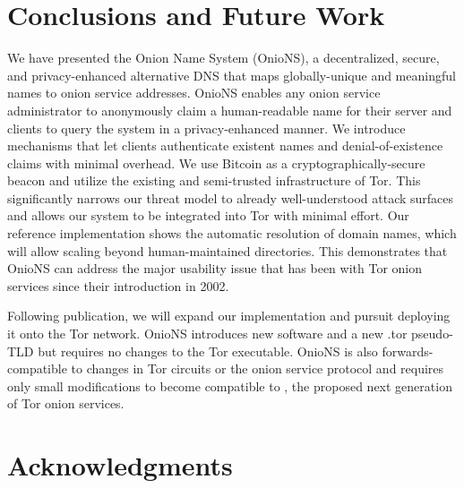 \documentclass[USenglish,oneside,twocolumn]{article}
\begin{document}

\section{Conclusions and Future Work}
\label{sec:Conclusion}

We have presented the Onion Name System (OnioNS), a decentralized, secure, and privacy-enhanced alternative DNS that maps globally-unique and meaningful names to onion service addresses. OnioNS enables any onion service administrator to anonymously claim a human-readable name for their server and clients to query the system in a privacy-enhanced manner. We introduce mechanisms that let clients authenticate existent names and denial-of-existence claims with minimal overhead. We use Bitcoin as a cryptographically-secure beacon and utilize the existing and semi-trusted infrastructure of Tor. This significantly narrows our threat model to already well-understood attack surfaces and allows our system to be integrated into Tor with minimal effort. Our reference implementation shows the automatic resolution of domain names, which will allow scaling beyond human-maintained directories. This demonstrates that OnioNS can address the major usability issue that has been with Tor onion services since their introduction in 2002.

Following publication, we will expand our implementation and pursuit deploying it onto the Tor network. OnioNS introduces new software and a new .tor pseudo-TLD but requires no changes to the Tor executable. OnioNS is also forwards-compatible to changes in Tor circuits or the onion service protocol and requires only small modifications to become compatible to \cite{TorProp224}, the proposed next generation of Tor onion services.


\section{Acknowledgments}
\end{document}
